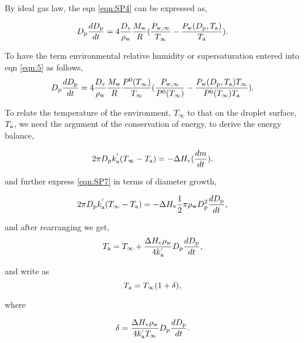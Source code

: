 \documentclass[12pt]{article}
\begin{document}
By ideal gas law, the eqn \ref{eqn:SP4} can be expressed as,

\begin{equation}\label{eqn:SP5}
D_{\rm p}\frac{dD_{\rm p}}{dt}=4 \frac{D_{\rm v}} {\rho_{\rm w}} \frac{M_{\rm w}}{R} (\frac{P_{\rm w, \infty}}{T_{\infty}} - \frac{P_{\rm w}(D_{\rm p}, T_{\rm a})}{T_{\rm a}}).
\end{equation}

To have the term environmental relative humidity or supersaturation entered into eqn \ref{eqn:5} as follows,  
\begin{equation}\label{eqn:SP6}
D_{\rm p}\frac{dD_{\rm p}}{dt}=4  \frac{D_{\rm v}} {\rho_{\rm w}} \frac{M_{\rm w}}{R} \frac{P^{\rm 0}(T_{\infty})} {T_{\infty}} (\frac{P_{\rm w, \infty}}{P^{\rm 0}(T_{\infty})} - \frac{P_{\rm w}(D_{\rm p}, T_{\rm a}) T_{\infty}}{P^{\rm 0}(T_{\infty}) T_{\rm a}}).
\end{equation}

To relate the temperature of the environment, $T_{\infty}$ to that on the droplet surface, $T_{\rm a}$, we need the argument of the conservation of energy, to derive the energy balance,

\begin{equation}\label{eqn:SP7}
2 \pi D_{\rm p} k^{'}_{\rm a} (T_{\infty}-T_{\rm a})= -\Delta H_{\rm v}(\frac{dm}{dt}).
\end{equation}

and further express \ref{eqn:SP7} in terms of diameter growth, 

\begin{equation}\label{eqn:SP8}
2 \pi D_{\rm p} k^{'}_{\rm a} (T_{\infty}-T_{\rm a})= -\Delta H_{\rm v} \frac{1}{2} \pi \rho_{\rm w} D_{\rm p}^{2} \frac{dD_{\rm p}}{dt},
\end{equation}

and after rearranging we get, 
\begin{equation}\label{eqn:SP9}
T_{\rm a}= T_{\infty} + \frac{\Delta H_{\rm v}  \rho_{\rm w}}{4 k^{'}_{\rm a}} D_{\rm p} \frac{dD_{\rm p}}{dt},
\end{equation}

and write as 
\begin{equation}\label{eqn:SP10}
T_{\rm a}=T_{\infty}(1+\delta),
\end{equation}

where 

\begin{equation}\label{eqn:SP11}
\delta= \frac{\Delta H_{\rm v}  \rho_{\rm w}}{4 k^{'}_{\rm a}T_{\infty}} D_{\rm p} \frac{dD_{\rm p}}{dt}.
\end{equation}
\end{document}
